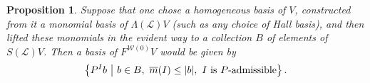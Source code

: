 \documentclass[11pt]{amsart}
\theoremstyle{plain}
\newtheorem{prop}[thm]{Proposition}
\theoremstyle{definition}
\renewcommand{\to}{\longrightarrow}
\newcommand{\scrL}{\mathscr{L}}
\newcommand{\scrC}{\mathscr{C}}
\newcommand{\calW}{\mathcal{W}}
\newcommand{\calP}{\mathcal{P}}
\newcommand{\calV}{\mathcal{V}}
\theoremstyle{plain}
\newcommand{\Palg}{{\calP}}
\newcommand{\LieOperad}{{\scrL}}
\newcommand{\vect}[2]{\calV^{#1}_{#2}}
\newcommand{\minDimP}{\overline{m}}
\newcommand{\algs}{\scrC\!\textit{om}}
\begin{document}
\begin{Constructing homotopy and cohomotopy operations}
\begin{prop}
Suppose that one chose a homogeneous basis of $V$, constructed from it a monomial  basis of $\Lambda(\LieOperad)V$ (such as any choice of Hall basis), and then lifted these monomials in the evident way to a collection $B$ of elements of $S(\LieOperad)V$. Then a basis of $F^{\calW(0)}V$ would be given by
\[\left\{P^Ib\ \middle|\ b\in B,\ \minDimP(I)\leq|b|,\ \textup{$I$ is $P$-admissible}\right\}.\]
\end{prop}
%
%
%
%
%
%
%

\end{Constructing homotopy and cohomotopy operations}
\end{document}

